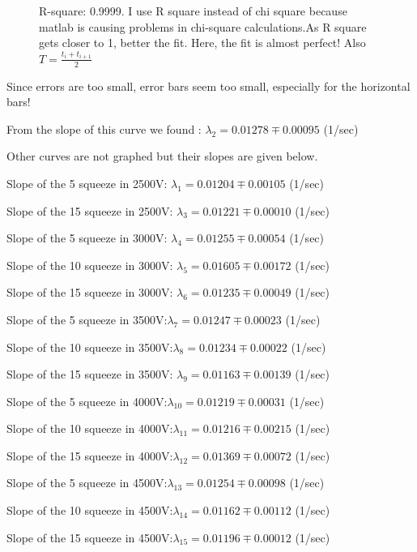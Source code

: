 \documentclass[10pt,a4paper]{article}
\begin{document}
{\begin{figure}[H]
	\caption{R-square: 0.9999. I use R square instead of chi square because matlab is causing problems in chi-square calculations.As R square gets closer to 1, better the fit. Here, the fit is almost perfect! Also $T=\frac {t_i+t_{i+1}}{2}$ }
	\end{figure}
\par Since errors are too small, error bars seem too small, especially for the horizontal bars!
\\[\baselineskip]
\par From the slope of this curve we found :  $\lambda_2=0.01278 \mp  0.00095$ (1/sec)
\\[\baselineskip]
\par Other curves are not graphed but their slopes are given below.
\par Slope of the 5 squeeze in 2500V: $\lambda_1=0.01204 \mp 0.00105$ (1/sec)
\par Slope of the 15 squeeze in 2500V: $\lambda_3=0.01221  \mp 0.00010$ (1/sec)
\\[\baselineskip]
\par Slope of the 5 squeeze in 3000V:  $\lambda_4=0.01255\mp 0.00054 $ (1/sec)
\par Slope of the 10 squeeze in 3000V:  $\lambda_5=0.01605\mp 0.00172$ (1/sec)
\par Slope of the 15 squeeze in 3000V: $\lambda_6=0.01235\mp 0.00049$ (1/sec)
 \\[\baselineskip]
\par Slope of the 5 squeeze in 3500V:$\lambda_7=0.01247 \mp0.00023$ (1/sec)
\par Slope of the 10 squeeze in 3500V:$\lambda_8=0.01234 \mp 0.00022$  (1/sec)
\par Slope of the 15 squeeze in 3500V: $\lambda_9=0.01163 \mp 0.00139$ (1/sec)
\\[\baselineskip]
\par Slope of the 5 squeeze in 4000V:$\lambda_{10}=0.01219 \mp 0.00031$ (1/sec)
\par Slope of the 10 squeeze in 4000V:$\lambda_{11}=0.01216 \mp 0.00215$ (1/sec)
\par Slope of the 15 squeeze in 4000V:$\lambda_{12}=0.01369 \mp 0.00072$ (1/sec)
\\[\baselineskip]
\par Slope of the 5 squeeze in 4500V:$\lambda_{13}=0.01254 \mp 0.00098$ (1/sec)
\par Slope of the 10 squeeze in 4500V:$\lambda_{14}= 0.01162 \mp 0.00112$  (1/sec)
\par Slope of the 15 squeeze in 4500V:$\lambda_{15}=0.01196 \mp 0.00012$ (1/sec)
}
\end{document}
